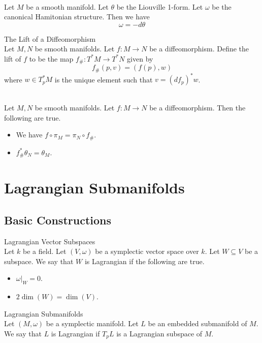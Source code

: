 \documentclass[a4paper]{article}
\begin{document}
\begin{prp}{}{}\\
Let $M$ be a smooth manifold. Let $\theta$ be the Liouville 1-form. Let $\omega$ be the canonical Hamitonian structure. Then we have $$\omega=-d\theta$$
\end{prp}

\begin{defn}{The Lift of a Diffeomorphism}{}\\
Let $M,N$ be smooth manifolds. Let $f:M\to N$ be a diffeomorphism. Define the lift of $f$ to be the map $f_\#:T^\ast M\to T^\ast N$ given by $$f_\#(p,v)=(f(p),w)$$ where $w\in T_p^\ast M$ is the unique element such that $v=(df_p)^\ast w$. 
\end{defn}

\begin{prp}{}{}\\
Let $M,N$ be smooth manifolds. Let $f:M\to N$ be a diffeomorphism. Then the following are true. 
\begin{itemize}
\item We have $f\circ\pi_M=\pi_N\circ f_\#$. 
\item $f_\#^\ast\theta_N=\theta_M$. 
\end{itemize}
\end{prp}

\pagebreak
\section{Lagrangian Submanifolds}
\subsection{Basic Constructions}
\begin{defn}{Lagrangian Vector Subspaces}{}\\
Let $k$ be a field. Let $(V,\omega)$ be a symplectic vector space over $k$. Let $W\subseteq V$ be a subspace. We say that $W$ is Lagrangian if the following are true. 
\begin{itemize}
\item $\omega|_W=0$. 
\item $2\dim(W)=\dim(V)$. 
\end{itemize}
\end{defn}

\begin{defn}{Lagrangian Submanifolds}{}\\
Let $(M,\omega)$ be a symplectic manifold. Let $L$ be an embedded submanifold of $M$. We say that $L$ is Lagrangian if $T_pL$ is a Lagrangian subspace of $M$. 
\end{defn}
\end{document}
